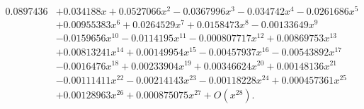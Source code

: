 \documentclass[a4paper,reqno,index]{amsart}
\numberwithin{equation}{section}
\theoremstyle{definition}
\begin{document}
\bigskip

\begin{equation*}
\begin{split}
0.0897436 & + 0.034188 x + 0.0527066 x^2 - 0.0367996 x^3 - 0.034742 x^4 - 0.0261686 x^5  
\\  &+ 0.00955383 x^6 + 0.0264529 x^7 + 0.0158473 x^8 - 0.00133649 x^9
\\ & - 0.0159656 x^{10}
 - 0.0114195 x^{11} - 0.000807717 x^{12} + 0.00869753 x^{13}
 \\ &+ 0.00813241 x^{14} + 0.00149954 x^{15}
 - 0.00457937 x^{16} - 0.00543892 x^{17}
 \\ & - 0.0016476 x^{18} + 0.00233904 x^{19} + 0.00346624 x^{20} + 0.00148136 x^{21}
 \\ & - 0.00111411 x^{22} - 0.00214143 x^{23} - 0.00118228 x^{24}
 + 0.000457361 x^{25}
 \\  & + 0.00128963 x^{26} + 0.000875075 x^{27} +O(x^{28}).
 \end{split}
 \end{equation*}

 \newpage

 \printindex
 
\end{document}

